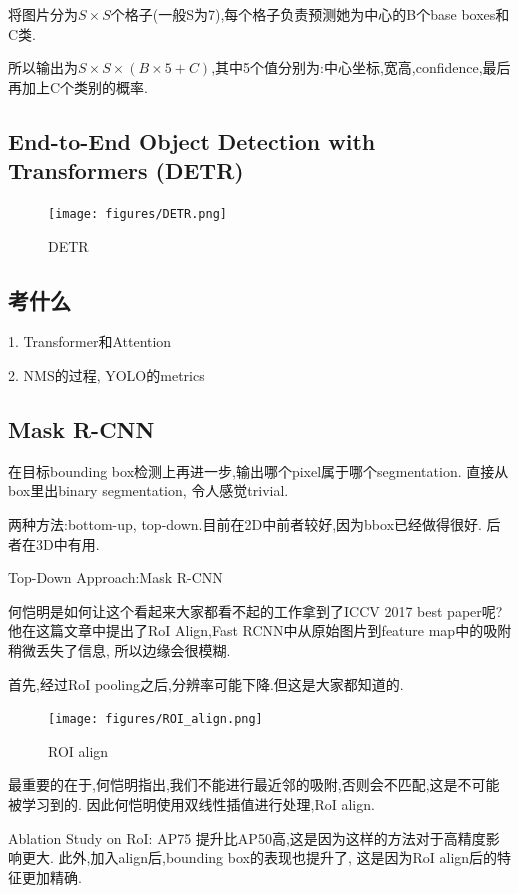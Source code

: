 将图片分为$S\times S$个格子(一般S为7),每个格子负责预测她为中心的B个base boxes和C类.

所以输出为$S\times S\times (B\times 5+C)$,其中5个值分别为:中心坐标,宽高,confidence,最后再加上C个类别的概率.

\subsection{End-to-End Object Detection with Transformers (DETR)}

\begin{figure}[htbp]
    \centering
    \texttt{[image: figures/DETR.png]}
    \caption{DETR}
    \label{fig:DETR}
\end{figure}

\subsection{考什么}

1. Transformer和Attention

2. NMS的过程, YOLO的metrics

\subsection{Mask R-CNN}

在目标bounding box检测上再进一步,输出哪个pixel属于哪个segmentation.
直接从box里出binary segmentation, 令人感觉trivial.

两种方法:bottom-up, top-down.目前在2D中前者较好,因为bbox已经做得很好.
后者在3D中有用.

Top-Down Approach:Mask R-CNN

何恺明是如何让这个看起来大家都看不起的工作拿到了ICCV 2017 best paper呢?
他在这篇文章中提出了RoI Align,Fast RCNN中从原始图片到feature map中的吸附
稍微丢失了信息, 所以边缘会很模糊.

首先,经过RoI pooling之后,分辨率可能下降.但这是大家都知道的.

\begin{figure}[H]
    \centering
    \texttt{[image: figures/ROI\_align.png]}
    \caption{ROI align}
    \label{fig:ROI_align}
\end{figure}

最重要的在于,何恺明指出,我们不能进行最近邻的吸附,否则会不匹配,这是不可能被学习到的.
因此何恺明使用双线性插值进行处理,RoI align.

Ablation Study on RoI:
AP75 提升比AP50高,这是因为这样的方法对于高精度影响更大.
此外,加入align后,bounding box的表现也提升了, 这是因为RoI align后的特征更加精确.

